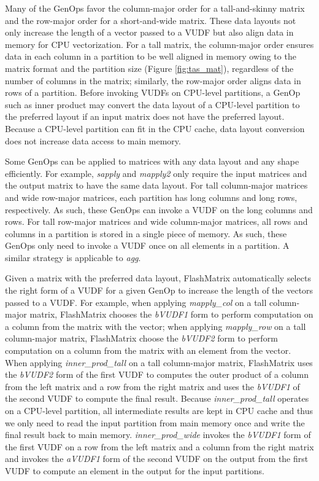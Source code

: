 Many of the GenOps favor the column-major order for a tall-and-skinny matrix
and the row-major order for a short-and-wide matrix. These data layouts not only
increase the length of a vector passed to a VUDF but also align data in memory
for CPU vectorization. For a tall matrix, the column-major order ensures data
in each column in a partition to be well aligned in memory owing to the matrix
format and the partition size (Figure \ref{fig:tas_mat}), regardless of the number
of columns in the matrix; similarly, the row-major order aligns data in rows of
a partition. Before invoking VUDFs on
CPU-level partitions, a GenOp such as inner product may convert the data layout
of a CPU-level partition to the preferred layout if an input matrix does not
have the preferred layout.
Because a CPU-level partition can fit in the CPU cache, data layout conversion
does not increase data access to main memory. 

Some GenOps can be applied to matrices with any data layout and any shape
efficiently. For example, \textit{sapply} and \textit{mapply2} only require
the input matrices and the output matrix to have the same data layout. For tall
column-major matrices and wide row-major matrices, each partition has long
columns and long rows, respectively. As such, these GenOps can invoke a VUDF
on the long columns and rows. For tall row-major matrices and wide column-major
matrices, all rows and columns in a partition is stored in a single piece of
memory. As such, these GenOps only need to invoke a VUDF once on all elements
in a partition. A similar strategy is applicable to \textit{agg}.

Given a matrix with the preferred data layout, FlashMatrix automatically
selects the right form of a VUDF for a given GenOp to increase the length of
the vectors passed to a VUDF. For example, when applying \textit{mapply\_col}
on a tall column-major matrix, FlashMatrix chooses the \textit{bVUDF1} form to
perform computation on a column from the matrix with the vector; when applying
\textit{mapply\_row} on a tall column-major matrix, FlashMatrix choose
the \textit{bVUDF2} form to perform computation on a column from the matrix
with an element from the vector. When applying \textit{inner\_prod\_tall} on a tall
column-major matrix, FlashMatrix uses the \textit{bVUDF2} form of the first
VUDF to computes the outer product of a column from the left matrix and a row
from the right matrix and uses the \textit{bVUDF1} of the second VUDF to compute
the final result. Because \textit{inner\_prod\_tall} operates on a CPU-level
partition, all intermediate results are kept in CPU cache and thus we only need
to read the input partition from main memory once and write the final result
back to main memory. \textit{inner\_prod\_wide} invokes the
\textit{bVUDF1} form of the first VUDF on a row from the left matrix and a column
from the right matrix and invokes the \textit{aVUDF1} form of the second VUDF
on the output from the first VUDF to compute an element in the output for
the input partitions.

